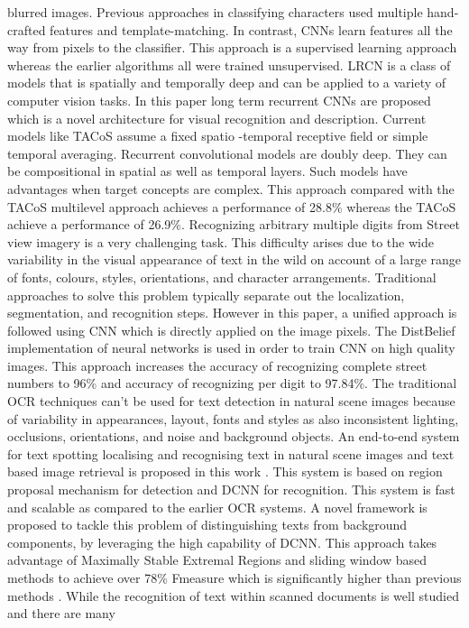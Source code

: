 \documentclass[12pt]{article}
\begin{document}
blurred images. Previous approaches in classifying
characters used multiple hand-crafted features  and
template-matching. In contrast, CNNs learn features all
the way from pixels to the classifier. This approach is a
supervised learning approach whereas the earlier algorithms
all were trained unsupervised.
LRCN  is a class of models that is spatially and
temporally deep and can be applied to a variety of computer
vision tasks. In this paper long term recurrent CNNs are
proposed which is a novel architecture for visual
recognition and description. Current models like TACoS
assume a fixed spatio -temporal receptive field or simple
temporal averaging. Recurrent convolutional models are
doubly deep. They can be compositional in spatial as well
as temporal layers. Such models have advantages when
target concepts are complex. This approach compared with
the TACoS  multilevel approach achieves a
performance of 28.8\% whereas the TACoS achieve a
performance of 26.9\%. Recognizing arbitrary multiple
digits from Street view imagery is a very challenging task.
This difficulty arises due to the wide variability in the
visual appearance of text in the wild on account of a large
range of fonts, colours, styles, orientations, and character
arrangements. Traditional approaches to solve this
problem typically separate out the localization,
segmentation, and recognition steps. However in this paper,
a unified approach is followed using CNN which is directly
applied on the image pixels. The DistBelief
implementation of neural networks is used in order to train
CNN on high quality images. This approach increases the
accuracy of recognizing complete street numbers to 96\%
and accuracy of recognizing per digit to 97.84\%.
The traditional OCR techniques can’t be used for text
detection in natural scene images because of variability in
appearances, layout, fonts and styles as also inconsistent
lighting, occlusions, orientations, and noise and background
objects. An end-to-end system for text spotting localising
and recognising text in natural scene images and text
based image retrieval is proposed in this work . This
system is based on region proposal mechanism for detection
and DCNN for recognition. This system is fast and scalable
as compared to the earlier OCR systems. A novel
framework is proposed to tackle this problem of
distinguishing texts from background components, by
leveraging the high capability of DCNN. This approach
takes advantage of Maximally Stable Extremal Regions and
sliding window based methods to achieve over 78\% Fmeasure which is significantly higher than previous
methods . While the recognition of text within
scanned documents is well studied and there are many
\end{document}
